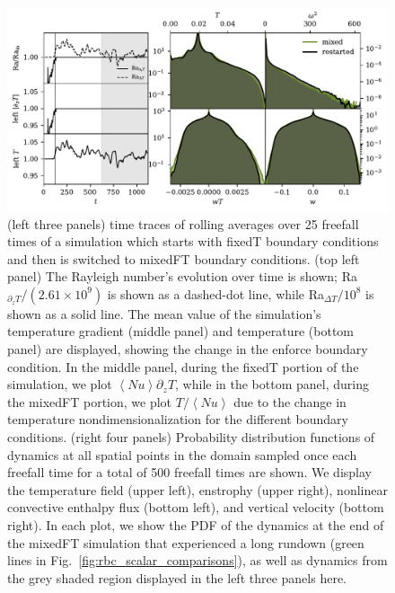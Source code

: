\documentclass[aps, pre, onecolumn, nofootinbib, notitlepage, groupedaddress, amsfonts, amssymb, amsmath, longbibliography]{revtex4-1}
\newcommand{\angles}[1]{\ensuremath{\left\langle #1 \right\rangle}}
\begin{document}
\begin{figure}
\includegraphics[width=\textwidth]{./figs/rbc_restart_description.pdf}
\caption{ 
	(left three panels) time traces of rolling averages over 25 freefall times of a simulation which starts with fixedT boundary conditions and then is switched to mixedFT boundary conditions.
	(top left panel) The Rayleigh number's evolution over time is shown; Ra$_{\partial_z T}/(2.61\times 10^9)$ is shown as a dashed-dot line, while Ra$_{\Delta T}/10^8$ is shown as a solid line.
	The mean value of the simulation's temperature gradient (middle panel) and temperature (bottom panel) are displayed, showing the change in the enforce boundary condition.
	In the middle panel, during the fixedT portion of the simulation, we plot $\angles{Nu}\partial_z T$, while in the bottom panel, during the mixedFT portion, we plot $T / \angles{Nu}$ due to the change in temperature nondimensionalization for the different boundary conditions.
	(right four panels) Probability distribution functions of dynamics at all spatial points in the domain sampled once each freefall time for a total of 500 freefall times are shown.
	We display the temperature field (upper left), enstrophy (upper right), nonlinear convective enthalpy flux (bottom left), and vertical velocity (bottom right).
	In each plot, we show the PDF of the dynamics at the end of the mixedFT simulation that experienced a long rundown (green lines in Fig.~\ref{fig:rbc_scalar_comparisons}), as well as dynamics from the grey shaded region displayed in the left three panels here.
\label{fig:rbc_restart_description} }
\end{figure}
\end{document}
